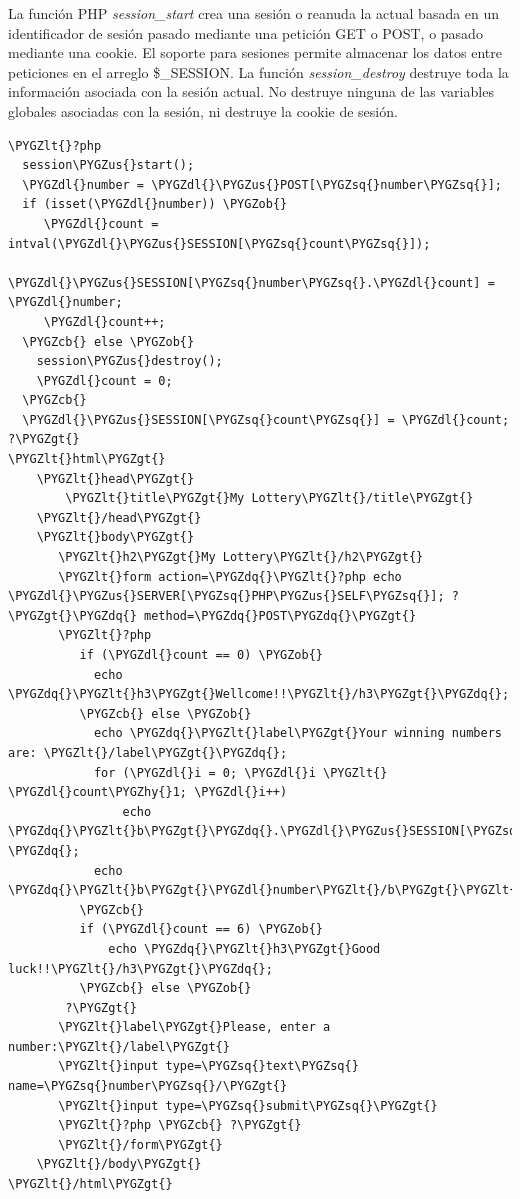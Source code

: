 \documentclass[a5paper,10pt,spanish]{sphinxmanual}
\def\PYGZus{\char`\_}
\def\PYGZob{\char`\{}
\def\PYGZcb{\char`\}}
\def\PYGZlt{\char`\<}
\def\PYGZgt{\char`\>}
\def\PYGZdl{\char`\$}
\def\PYGZhy{\char`\-}
\def\PYGZsq{\char`\'}
\def\PYGZdq{\char`\"}
\begin{document}
La función PHP \emph{session\_start} crea una sesión o reanuda la actual
basada en un identificador de sesión pasado mediante una petición GET o
POST, o pasado mediante una cookie. El soporte para sesiones permite
almacenar los datos entre peticiones en el arreglo \$\_SESSION. La
función \emph{session\_destroy} destruye toda la información asociada con la
sesión actual. No destruye ninguna de las variables globales asociadas
con la sesión, ni destruye la cookie de sesión.

\begin{Verbatim}[commandchars=\\\{\}]
\PYGZlt{}?php
  session\PYGZus{}start();
  \PYGZdl{}number = \PYGZdl{}\PYGZus{}POST[\PYGZsq{}number\PYGZsq{}];
  if (isset(\PYGZdl{}number)) \PYGZob{}
     \PYGZdl{}count = intval(\PYGZdl{}\PYGZus{}SESSION[\PYGZsq{}count\PYGZsq{}]);
     \PYGZdl{}\PYGZus{}SESSION[\PYGZsq{}number\PYGZsq{}.\PYGZdl{}count] = \PYGZdl{}number;
     \PYGZdl{}count++;
  \PYGZcb{} else \PYGZob{}
    session\PYGZus{}destroy();
    \PYGZdl{}count = 0;
  \PYGZcb{}
  \PYGZdl{}\PYGZus{}SESSION[\PYGZsq{}count\PYGZsq{}] = \PYGZdl{}count;
?\PYGZgt{}
\PYGZlt{}html\PYGZgt{}
    \PYGZlt{}head\PYGZgt{}
        \PYGZlt{}title\PYGZgt{}My Lottery\PYGZlt{}/title\PYGZgt{}
    \PYGZlt{}/head\PYGZgt{}
    \PYGZlt{}body\PYGZgt{}
       \PYGZlt{}h2\PYGZgt{}My Lottery\PYGZlt{}/h2\PYGZgt{}
       \PYGZlt{}form action=\PYGZdq{}\PYGZlt{}?php echo \PYGZdl{}\PYGZus{}SERVER[\PYGZsq{}PHP\PYGZus{}SELF\PYGZsq{}]; ?\PYGZgt{}\PYGZdq{} method=\PYGZdq{}POST\PYGZdq{}\PYGZgt{}
       \PYGZlt{}?php
          if (\PYGZdl{}count == 0) \PYGZob{}
            echo \PYGZdq{}\PYGZlt{}h3\PYGZgt{}Wellcome!!\PYGZlt{}/h3\PYGZgt{}\PYGZdq{};
          \PYGZcb{} else \PYGZob{}
            echo \PYGZdq{}\PYGZlt{}label\PYGZgt{}Your winning numbers are: \PYGZlt{}/label\PYGZgt{}\PYGZdq{};
            for (\PYGZdl{}i = 0; \PYGZdl{}i \PYGZlt{} \PYGZdl{}count\PYGZhy{}1; \PYGZdl{}i++)
                echo \PYGZdq{}\PYGZlt{}b\PYGZgt{}\PYGZdq{}.\PYGZdl{}\PYGZus{}SESSION[\PYGZsq{}number\PYGZsq{}.\PYGZdl{}i].\PYGZdq{}\PYGZlt{}/b\PYGZgt{}, \PYGZdq{};
            echo \PYGZdq{}\PYGZlt{}b\PYGZgt{}\PYGZdl{}number\PYGZlt{}/b\PYGZgt{}\PYGZlt{}/p\PYGZgt{}\PYGZdq{};
          \PYGZcb{}
          if (\PYGZdl{}count == 6) \PYGZob{}
              echo \PYGZdq{}\PYGZlt{}h3\PYGZgt{}Good luck!!\PYGZlt{}/h3\PYGZgt{}\PYGZdq{};
          \PYGZcb{} else \PYGZob{}
        ?\PYGZgt{}
       \PYGZlt{}label\PYGZgt{}Please, enter a number:\PYGZlt{}/label\PYGZgt{}
       \PYGZlt{}input type=\PYGZsq{}text\PYGZsq{} name=\PYGZsq{}number\PYGZsq{}/\PYGZgt{}
       \PYGZlt{}input type=\PYGZsq{}submit\PYGZsq{}\PYGZgt{}
       \PYGZlt{}?php \PYGZcb{} ?\PYGZgt{}
       \PYGZlt{}/form\PYGZgt{}
    \PYGZlt{}/body\PYGZgt{}
\PYGZlt{}/html\PYGZgt{}
\end{Verbatim}
\end{document}
